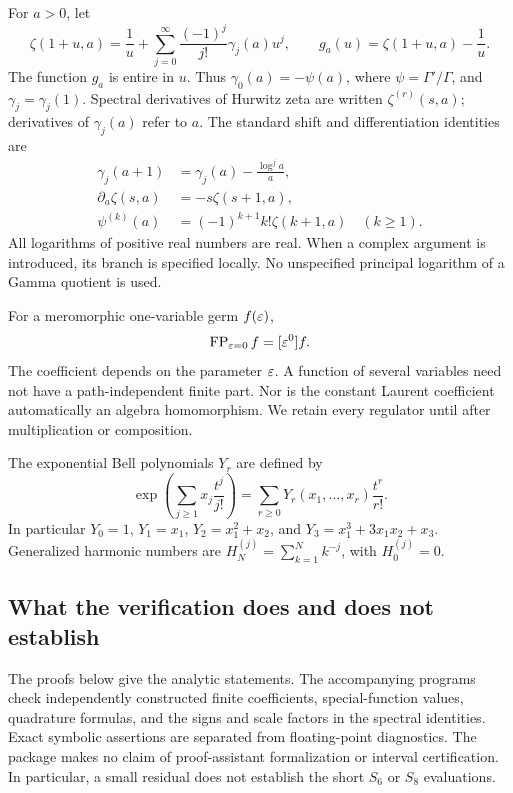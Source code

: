 For $a>0$, let
\begin{equation}\label{eq:stieltjes}
 \zeta(1+u,a)=\frac1u+
 \sum_{j=0}^{\infty}\frac{(-1)^j}{j!}\gamma_j(a)u^j,
 \qquad g_a(u)=\zeta(1+u,a)-\frac1u.
\end{equation}
The function $g_a$ is entire in $u$. Thus $\gamma_0(a)=-\psi(a)$,
where $\psi=\Gamma'/\Gamma$, and $\gamma_j=\gamma_j(1)$.
Spectral derivatives of Hurwitz zeta are written $\zeta^{(r)}(s,a)$;
derivatives of $\gamma_j(a)$ refer to $a$. The standard shift and
differentiation identities are \cite[\S25.11]{dlmf}
\begin{align}
 \gamma_j(a+1)&=\gamma_j(a)-\frac{\log^j a}{a},\label{eq:gshift}\\
 \partial_a\zeta(s,a)&=-s\zeta(s+1,a),\label{eq:zshiftder}\\
 \psi^{(k)}(a)&=(-1)^{k+1}k!\zeta(k+1,a)\quad(k\ge1).
\end{align}
All logarithms of positive real numbers are real. When a complex argument
is introduced, its branch is specified locally. No unspecified principal
logarithm of a Gamma quotient is used.

For a meromorphic one-variable germ $f(\varepsilon)$,
\begin{equation}
 \operatorname{FP}_{\varepsilon=0}f=[\varepsilon^{0}]f.
\end{equation}
The coefficient depends on the parameter $\varepsilon$. A function of several
variables need not have a path-independent finite part. Nor is the
constant Laurent coefficient automatically an algebra homomorphism.
We retain every regulator until after multiplication or composition.

The exponential Bell polynomials $Y_r$ are defined by
\begin{equation}\label{eq:bell}
 \exp\left(\sum_{j\ge1}x_j\frac{t^j}{j!}\right)
 =\sum_{r\ge0}Y_r(x_1,\ldots,x_r)\frac{t^r}{r!}.
\end{equation}
In particular $Y_0=1$, $Y_1=x_1$, $Y_2=x_1^2+x_2$, and
$Y_3=x_1^3+3x_1x_2+x_3$. Generalized harmonic numbers are
$H_N^{(j)}=\sum_{k=1}^N k^{-j}$, with $H_0^{(j)}=0$.

\subsection{What the verification does and does not establish}

The proofs below give the analytic statements. The accompanying programs
check independently constructed finite coefficients, special-function
values, quadrature formulas, and the signs and scale factors in the
spectral identities. Exact symbolic assertions are separated from
floating-point diagnostics. The package makes no claim of proof-assistant
formalization or interval certification. In particular, a small residual
does not establish the short $S_6$ or $S_8$ evaluations.

